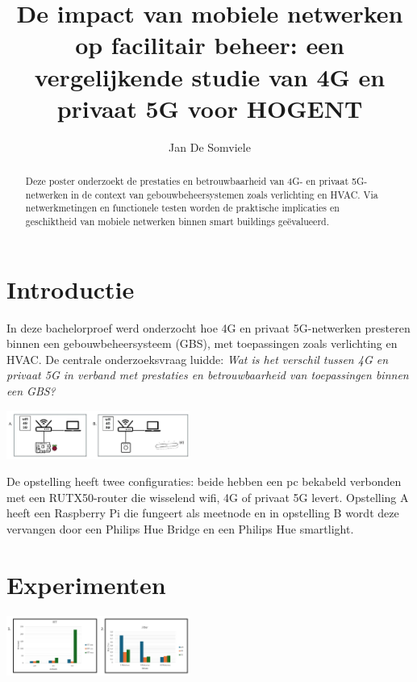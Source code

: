 \documentclass[a0,portrait]{hogent-poster}
\title{De impact van mobiele netwerken op facilitair beheer: een vergelijkende studie van 4G en privaat 5G voor HOGENT}
\author{Jan De Somviele}
\begin{document}
\maketitle

\begin{abstract}
Deze poster onderzoekt de prestaties en betrouwbaarheid van 4G- en privaat 5G-netwerken in de context van gebouwbeheersystemen zoals verlichting en HVAC. Via netwerkmetingen en functionele testen worden de praktische implicaties en geschiktheid van mobiele netwerken binnen smart buildings geëvalueerd.
\end{abstract}

\begin{multicols}{2} %

\section{Introductie}

In deze bachelorproef werd onderzocht hoe 4G en privaat 5G-netwerken presteren binnen een gebouwbeheersysteem (GBS), met toepassingen zoals verlichting en HVAC. De centrale onderzoeksvraag luidde: \textit{Wat is het verschil tussen 4G en privaat 5G in verband met prestaties en betrouwbaarheid van toepassingen binnen een GBS?}

\begin{center}
    \captionsetup{type=figure}
    \includegraphics[width=0.45\textwidth]{../graphics/beideOpstellingen.jpg}
\end{center}
De opstelling heeft twee configuraties: beide hebben een pc bekabeld verbonden met een RUTX50-router die wisselend wifi, 4G of privaat 5G levert. Opstelling A heeft een Raspberry Pi die fungeert als meetnode en in opstelling B wordt deze vervangen door een Philips Hue Bridge en een Philips Hue smartlight.
\section{Experimenten}

\begin{center}
    \captionsetup{type=figure}
    \includegraphics[width=0.45\textwidth]{../graphics/Latency-Jitter-grafiek.png}
\end{center}


\end{multicols}
\end{document}
